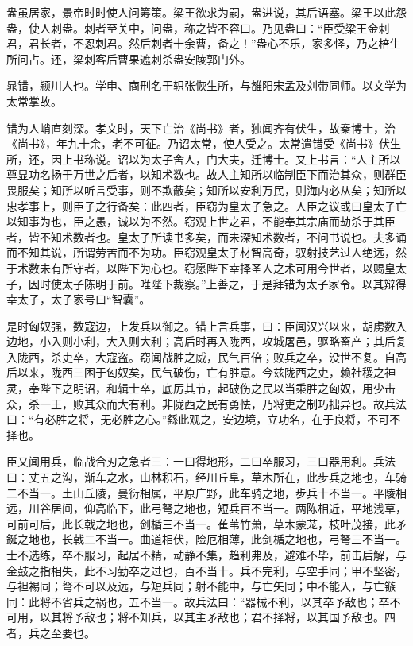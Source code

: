 \documentclass[12pt,UTF8]{ctexbook}
\begin{document}
盎虽居家，景帝时时使人问筹策。梁王欲求为嗣，盎进说，其后语塞。梁王以此怨盎，使人刺盎。刺者至关中，问盎，称之皆不容口。乃见盎曰：“臣受梁王金刺君，君长者，不忍刺君。然后刺者十余曹，备之！”盎心不乐，家多怪，乃之棓生所问占。还，梁刺客后曹果遮刺杀盎安陵郭门外。



晁错，颍川人也。学申、商刑名于轵张恢生所，与雒阳宋孟及刘带同师。以文学为太常掌故。



错为人峭直刻深。孝文时，天下亡治《尚书》者，独闻齐有伏生，故秦博士，治《尚书》，年九十余，老不可征。乃诏太常，使人受之。太常遣错受《尚书》伏生所，还，因上书称说。诏以为太子舍人，门大夫，迁博士。又上书言：“人主所以尊显功名扬于万世之后者，以知术数也。故人主知所以临制臣下而治其众，则群臣畏服矣；知所以听言受事，则不欺蔽矣；知所以安利万民，则海内必从矣；知所以忠孝事上，则臣子之行备矣：此四者，臣窃为皇太子急之。人臣之议或曰皇太子亡以知事为也，臣之愚，诚以为不然。窃观上世之君，不能奉其宗庙而劫杀于其臣者，皆不知术数者也。皇太子所读书多矣，而未深知术数者，不问书说也。夫多诵而不知其说，所谓劳苦而不为功。臣窃观皇太子材智高奇，驭射技艺过人绝远，然于术数未有所守者，以陛下为心也。窃愿陛下幸择圣人之术可用今世者，以赐皇太子，因时使太子陈明于前。唯陛下裁察。”上善之，于是拜错为太子家令。以其辩得幸太子，太子家号曰“智囊”。



是时匈奴强，数寇边，上发兵以御之。错上言兵事，曰：臣闻汉兴以来，胡虏数入边地，小入则小利，大入则大利；高后时再入陇西，攻城屠邑，驱略畜产；其后复入陇西，杀吏卒，大寇盗。窃闻战胜之威，民气百倍；败兵之卒，没世不复。自高后以来，陇西三困于匈奴矣，民气破伤，亡有胜意。今兹陇西之吏，赖社稷之神灵，奉陛下之明诏，和辑士卒，底厉其节，起破伤之民以当乘胜之匈奴，用少击众，杀一王，败其众而大有利。非陇西之民有勇怯，乃将吏之制巧拙异也。故兵法曰：“有必胜之将，无必胜之心。”繇此观之，安边境，立功名，在于良将，不可不择也。



臣又闻用兵，临战合刃之急者三：一曰得地形，二曰卒服习，三曰器用利。兵法曰：丈五之沟，渐车之水，山林积石，经川丘阜，草木所在，此步兵之地也，车骑二不当一。土山丘陵，曼衍相属，平原广野，此车骑之地，步兵十不当一。平陵相远，川谷居间，仰高临下，此弓弩之地也，短兵百不当一。两陈相近，平地浅草，可前可后，此长戟之地也，剑楯三不当一。萑苇竹萧，草木蒙茏，枝叶茂接，此矛鋋之地也，长戟二不当一。曲道相伏，险厄相薄，此剑楯之地也，弓弩三不当一。士不选练，卒不服习，起居不精，动静不集，趋利弗及，避难不毕，前击后解，与金鼓之指相失，此不习勤卒之过也，百不当十。兵不完利，与空手同；甲不坚密，与袒裼同；弩不可以及远，与短兵同；射不能中，与亡矢同；中不能入，与亡镞同：此将不省兵之祸也，五不当一。故兵法曰：“器械不利，以其卒予敌也；卒不可用，以其将予敌也；将不知兵，以其主矛敌也；君不择将，以其国予敌也。四者，兵之至要也。
\end{document}
